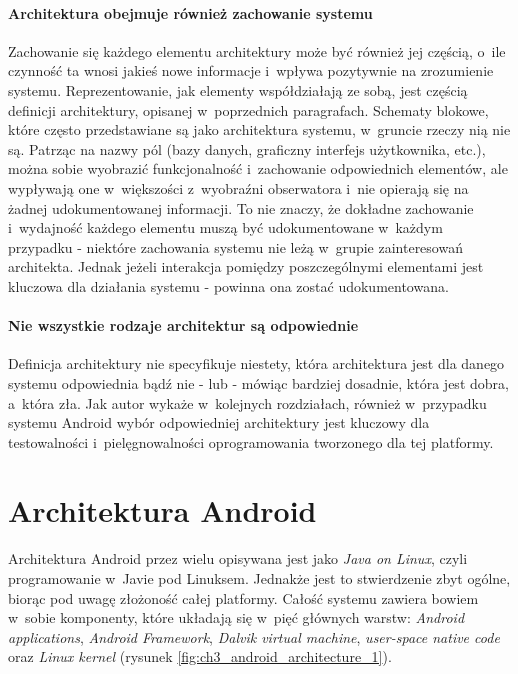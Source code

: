 \paragraph{Architektura obejmuje również zachowanie systemu\newline\newline}
Zachowanie się każdego elementu architektury może być również jej częścią, o~ile czynność ta wnosi jakieś nowe informacje i~wpływa pozytywnie na zrozumienie systemu. Reprezentowanie, jak elementy współdziałają ze sobą, jest częścią definicji architektury, opisanej w~poprzednich paragrafach. Schematy blokowe, które często przedstawiane są jako architektura systemu, w~gruncie rzeczy nią nie są. Patrząc na nazwy pól (bazy danych, graficzny interfejs użytkownika, etc.), można sobie wyobrazić funkcjonalność i~zachowanie odpowiednich elementów, ale wypływają one w~większości z~wyobraźni obserwatora i~nie opierają się na żadnej udokumentowanej informacji. To nie znaczy, że dokładne zachowanie i~wydajność każdego elementu muszą być udokumentowane w~każdym przypadku - niektóre zachowania systemu nie leżą w~grupie zainteresowań architekta. Jednak jeżeli interakcja pomiędzy poszczególnymi elementami jest kluczowa dla działania systemu - powinna ona zostać udokumentowana.

\paragraph{Nie wszystkie rodzaje architektur są odpowiednie\newline\newline}
Definicja architektury nie specyfikuje niestety, która architektura jest dla danego systemu odpowiednia bądź nie - lub - mówiąc bardziej dosadnie, która jest dobra, a~która zła. Jak autor wykaże w~kolejnych rozdziałach, również w~przypadku systemu Android wybór odpowiedniej architektury jest kluczowy dla testowalności i~pielęgnowalności  oprogramowania tworzonego dla tej platformy.

\section{Architektura Android}
Architektura Android przez wielu opisywana jest jako \textit{Java on Linux}, czyli programowanie w~Javie pod Linuksem. Jednakże jest to stwierdzenie zbyt ogólne, biorąc pod uwagę złożoność całej platformy. Całość systemu zawiera bowiem w~sobie komponenty, które układają się w~pięć głównych warstw: \textit{Android applications}, \textit{Android Framework}, \textit{Dalvik virtual machine}, \textit{user-space native code} oraz \textit{Linux kernel} \cite{bib:hacker:handbook} (rysunek \ref{fig:ch3_android_architecture_1}).

